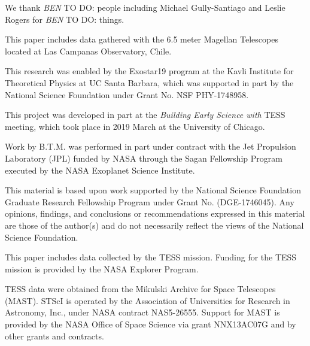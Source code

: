 \documentclass[twocolumn]{aastex63}
\newcommand{\todo}[3]{{\color{#2} \emph{#1} TO DO: #3}}
\newcommand{\btmtodo}[1]{\todo{BEN}{blue}{#1}}
\begin{document}
\acknowledgements

We thank \btmtodo{people including Michael Gully-Santiago and Leslie Rogers} for \btmtodo{things}.

This paper includes data gathered with the 6.5 meter Magellan Telescopes located at Las Campanas Observatory, Chile.


This research was enabled by the Exostar19 program at the Kavli Institute for Theoretical Physics at UC Santa Barbara, which was supported in part by the National Science Foundation under Grant No. NSF PHY-1748958.

This project was developed in part at the \textit{Building Early Science with} TESS meeting, which took place in 2019 March at the University of Chicago.

Work by B.T.M. was performed in part under contract with the Jet
Propulsion Laboratory (JPL) funded by NASA through
the Sagan Fellowship Program executed by the NASA
Exoplanet Science Institute.

This material is based upon work supported by the National Science Foundation Graduate Research Fellowship Program under Grant No. (DGE-1746045). Any opinions, findings, and conclusions or recommendations expressed in this material are those of the author(s) and do not necessarily reflect the views of the National Science Foundation.



This paper includes data collected by the TESS mission. Funding for the TESS mission is provided by the NASA Explorer Program.

TESS data were obtained from the Mikulski Archive for Space Telescopes
(MAST).
STScI is operated by the Association of Universities for Research in
Astronomy, Inc., under NASA contract NAS5-26555.
Support for MAST is provided by the NASA Office of Space Science via grant
NNX13AC07G and by other grants and contracts.










\end{document}
